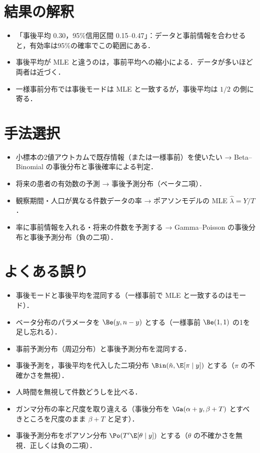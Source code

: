 \section{結果の解釈}\label{sec:17-interp}
\begin{itemize}
\item 「事後平均 0.30，95\%信用区間 0.15--0.47」：データと事前情報を合わせると，有効率は95\%の確率でこの範囲にある．
\item 事後平均が MLE と違うのは，事前平均への縮小による．データが多いほど両者は近づく．
\item 一様事前分布では事後モードは MLE と一致するが，事後平均は $1/2$ の側に寄る．
\end{itemize}

\section{手法選択}\label{sec:17-choice}
\begin{itemize}
\item 小標本の2値アウトカムで既存情報（または一様事前）を使いたい → Beta--Binomial の事後分布と事後確率による判定．
\item 将来の患者の有効数の予測 → 事後予測分布（ベータ二項）．
\item 観察期間・人口が異なる件数データの率 → ポアソンモデルの MLE $\hat\lambda=Y/T$．
\item 率に事前情報を入れる・将来の件数を予測する → Gamma--Poisson の事後分布と事後予測分布（負の二項）．
\end{itemize}

\section{よくある誤り}\label{sec:17-err}
\begin{warnbox}
\begin{itemize}
\item 事後モードと事後平均を混同する（一様事前で MLE と一致するのはモード）．
\item ベータ分布のパラメータを $\Be(y,n-y)$ とする（一様事前 $\Be(1,1)$ の1を足し忘れる）．
\item 事前予測分布（周辺分布）と事後予測分布を混同する．
\item 事後予測を，事後平均を代入した二項分布 $\Bin(\tilde n,\E[\pi\mid y])$ とする（$\pi$ の不確かさを無視）．
\item 人時間を無視して件数どうしを比べる．
\item ガンマ分布の率と尺度を取り違える（事後分布を $\Ga(\alpha+y,\beta+T)$ とすべきところを尺度のまま $\beta+T$ と足す）．
\item 事後予測分布をポアソン分布 $\Po(T'\E[\theta\mid y])$ とする（$\theta$ の不確かさを無視．正しくは負の二項）．
\end{itemize}
\end{warnbox}

